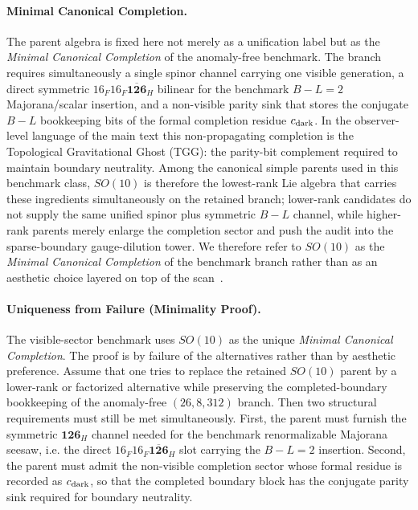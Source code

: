 \documentclass[11pt]{article}
\begin{document}
\paragraph*{Minimal Canonical Completion.}
The parent algebra is fixed here not merely as a unification label but as the
\emph{Minimal Canonical Completion} of the anomaly-free benchmark. The branch
requires simultaneously a single spinor channel carrying one visible
generation, a direct symmetric $16_F16_F\overline{\mathbf{126}}_H$ bilinear for
the benchmark $B-L=2$ Majorana/scalar insertion, and a non-visible parity sink
that stores the conjugate $B-L$ bookkeeping bits of the formal completion
residue $c_{\rm dark}$. In the observer-level language of the main text this
non-propagating completion is the Topological Gravitational Ghost (TGG): the
parity-bit complement required to maintain boundary neutrality. Among the
canonical simple parents used in this benchmark class, $SO(10)$ is therefore
the lowest-rank Lie algebra that carries these ingredients simultaneously on
the retained branch; lower-rank candidates do not supply the same unified
spinor plus symmetric $B-L$ channel, while higher-rank parents merely enlarge
the completion sector and push the audit into the sparse-boundary
gauge-dilution tower. We therefore refer to $SO(10)$ as the \emph{Minimal
Canonical Completion} of the benchmark branch rather than as an aesthetic
choice layered on top of the scan~\cite{babu1993,witten1989}.


\paragraph*{Uniqueness from Failure (Minimality Proof).}
The visible-sector benchmark uses $SO(10)$ as the unique \emph{Minimal
Canonical Completion}. The proof is by failure of the alternatives rather than
by aesthetic preference. Assume that one tries to replace the retained
$SO(10)$ parent by a lower-rank or factorized alternative while preserving the
completed-boundary bookkeeping of the anomaly-free $(26,8,312)$ branch. Then
two structural requirements must still be met simultaneously. First, the
parent must furnish the symmetric $\mathbf{126}_H$ channel needed for the
benchmark renormalizable Majorana seesaw, i.e. the direct
$16_F16_F\overline{\mathbf{126}}_H$ slot carrying the $B-L=2$ insertion.
Second, the parent must admit the non-visible completion sector whose formal
residue is recorded as $c_{\rm dark}$, so that the completed boundary block has
the conjugate parity sink required for boundary neutrality.
\end{document}
